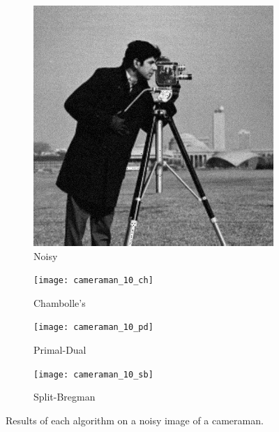 \documentclass[11pt]{article}
\begin{document}
\begin{figure}
\centering
\graphicspath{{images/}}
\begin{subfigure}[b]{0.4\textwidth}
\centering
\includegraphics[width=\textwidth]{cameraman_10}
\caption{Noisy}
\label{camera:noise}
\end{subfigure}
\begin{subfigure}[b]{0.4\textwidth}
\centering
\texttt{[image: cameraman\_10\_ch]}
\caption{Chambolle's}
\label{camera:ch}
\end{subfigure}
\begin{subfigure}[b]{0.4\textwidth}
\centering
\texttt{[image: cameraman\_10\_pd]}
\caption{Primal-Dual}
\label{camera:pd}
\end{subfigure}
\begin{subfigure}[b]{0.4\textwidth}
\centering
\texttt{[image: cameraman\_10\_sb]}
\caption{Split-Bregman}
\label{camera:sb}
\end{subfigure}
\caption{Results of each algorithm on a noisy image of a cameraman.}
\label{fig:cameraman:dn}
\end{figure}
\end{document}
